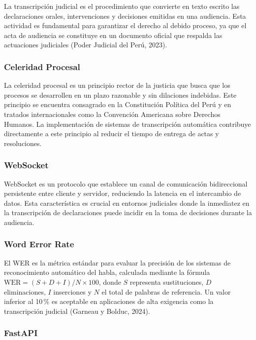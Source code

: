 \documentclass[12pt,a4paper,oneside]{article}
\begin{document}
La transcripci\'on judicial es el procedimiento que convierte en texto escrito las declaraciones orales, intervenciones y decisiones emitidas en una audiencia. Esta actividad es fundamental para garantizar el derecho al debido proceso, ya que el acta de audiencia se constituye en un documento oficial que respalda las actuaciones judiciales (Poder Judicial del Per\'u, 2023).

\subsubsection{Celeridad Procesal}

La celeridad procesal es un principio rector de la justicia que busca que los procesos se desarrollen en un plazo razonable y sin dilaciones indebidas. Este principio se encuentra consagrado en la Constituci\'on Pol\'itica del Per\'u y en tratados internacionales como la Convenci\'on Americana sobre Derechos Humanos. La implementaci\'on de sistemas de transcripci\'on autom\'atica contribuye directamente a este principio al reducir el tiempo de entrega de actas y resoluciones.

\subsubsection{WebSocket}

WebSocket es un protocolo que establece un canal de comunicaci\'on bidireccional persistente entre cliente y servidor, reduciendo la latencia en el intercambio de datos. Esta caracter\'istica es crucial en entornos judiciales donde la inmediatez en la transcripci\'on de declaraciones puede incidir en la toma de decisiones durante la audiencia.

\subsubsection{Word Error Rate}

El WER es la m\'etrica est\'andar para evaluar la precisi\'on de los sistemas de reconocimiento autom\'atico del habla, calculada mediante la f\'ormula $\text{WER} = (S + D + I) / N \times 100$, donde $S$ representa sustituciones, $D$ eliminaciones, $I$ inserciones y $N$ el total de palabras de referencia. Un valor inferior al 10\,\% es aceptable en aplicaciones de alta exigencia como la transcripci\'on judicial (Garneau y Bolduc, 2024).

\subsubsection{FastAPI}
\end{document}
